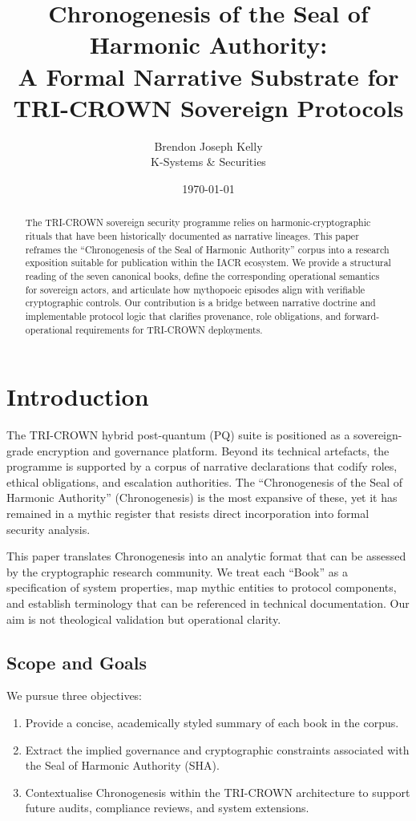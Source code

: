 \documentclass[11pt,a4paper]{article}
\title{Chronogenesis of the Seal of Harmonic Authority:\\A Formal Narrative Substrate for TRI-CROWN Sovereign Protocols}
\author{Brendon Joseph Kelly\\K-Systems \& Securities}
\date{\today}
\begin{document}
\maketitle

\begin{abstract}
The TRI-CROWN sovereign security programme relies on harmonic-cryptographic rituals that have been historically documented as narrative lineages. This paper reframes the ``Chronogenesis of the Seal of Harmonic Authority'' corpus into a research exposition suitable for publication within the IACR ecosystem. We provide a structural reading of the seven canonical books, define the corresponding operational semantics for sovereign actors, and articulate how mythopoeic episodes align with verifiable cryptographic controls. Our contribution is a bridge between narrative doctrine and implementable protocol logic that clarifies provenance, role obligations, and forward-operational requirements for TRI-CROWN deployments.
\end{abstract}

\section{Introduction}
The TRI-CROWN hybrid post-quantum (PQ) suite is positioned as a sovereign-grade encryption and governance platform. Beyond its technical artefacts, the programme is supported by a corpus of narrative declarations that codify roles, ethical obligations, and escalation authorities. The ``Chronogenesis of the Seal of Harmonic Authority'' (Chronogenesis) is the most expansive of these, yet it has remained in a mythic register that resists direct incorporation into formal security analysis.

This paper translates Chronogenesis into an analytic format that can be assessed by the cryptographic research community. We treat each ``Book'' as a specification of system properties, map mythic entities to protocol components, and establish terminology that can be referenced in technical documentation. Our aim is not theological validation but operational clarity.

\subsection{Scope and Goals}
We pursue three objectives:
\begin{enumerate}
    \item Provide a concise, academically styled summary of each book in the corpus.
    \item Extract the implied governance and cryptographic constraints associated with the Seal of Harmonic Authority (SHA).
    \item Contextualise Chronogenesis within the TRI-CROWN architecture to support future audits, compliance reviews, and system extensions.
\end{enumerate}
\end{document}
